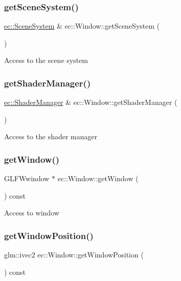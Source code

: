 \subsubsection{\texorpdfstring{get\+Scene\+System()}{getSceneSystem()}}
{\footnotesize\ttfamily \mbox{\hyperlink{classec_1_1_scene_system}{ec\+::\+Scene\+System}} \& ec\+::\+Window\+::get\+Scene\+System (\begin{DoxyParamCaption}{ }\end{DoxyParamCaption})}

Access to the scene system \mbox{\label{classec_1_1_window_adc63f54684ad3681c0d4bea8481b6322}} 
\subsubsection{\texorpdfstring{get\+Shader\+Manager()}{getShaderManager()}}
{\footnotesize\ttfamily \mbox{\hyperlink{classec_1_1_shader_manager}{ec\+::\+Shader\+Manager}} \& ec\+::\+Window\+::get\+Shader\+Manager (\begin{DoxyParamCaption}{ }\end{DoxyParamCaption})}

Access to the shader manager \mbox{\label{classec_1_1_window_abe525ce2f27fecf298b1ad0926024ae3}} 
\subsubsection{\texorpdfstring{get\+Window()}{getWindow()}}
{\footnotesize\ttfamily G\+L\+F\+Wwindow $\ast$ ec\+::\+Window\+::get\+Window (\begin{DoxyParamCaption}{ }\end{DoxyParamCaption}) const}

Access to window \mbox{\label{classec_1_1_window_accf3c652040d022bdd953ed69aec0df5}} 
\subsubsection{\texorpdfstring{get\+Window\+Position()}{getWindowPosition()}}
{\footnotesize\ttfamily glm\+::ivec2 ec\+::\+Window\+::get\+Window\+Position (\begin{DoxyParamCaption}{ }\end{DoxyParamCaption}) const}

